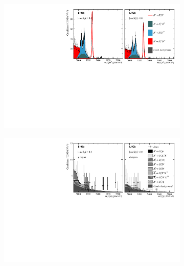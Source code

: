 \begin{figure}[!h]
    \centering
    \begin{subfigure}[t]{1.0\textwidth}
        \centering
        \includegraphics[width=1.0\textwidth]{figs/Appendix_FitCategories/canvas_DsD0_Ds2PiPiPi_both_summed_splitHel_splitKKPi_s21_s21r1_s24_s26.pdf}\\
    \end{subfigure}
    \begin{subfigure}[t]{1.0\textwidth}
        \centering
        \includegraphics[width=1.0\textwidth]{figs/Appendix_FitCategories/canvas_DsPhi_Ds2PiPiPi_both_summed_splitHel_splitKKPi_s21_s21r1_s24_s26.pdf}\\

\end{subfigure}
\end{figure}
